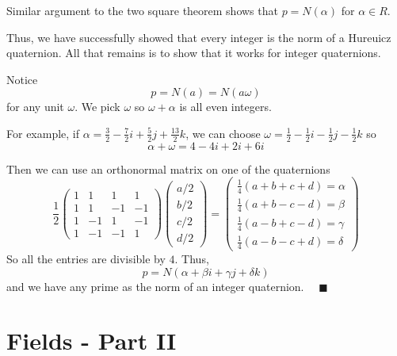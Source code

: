 \documentclass[12pt]{report}
\newcommand{\qed}{\quad \blacksquare}
\newenvironment*{tbox}[3][breakable]{
    \begin{tcolorbox}[
        parbox=false,
        colback=#2!5!white,
        colframe=#2!75!black,
        title={#3},
        #1
    ]}
    {\end{tcolorbox}}
\begin{document}
\begin{tbox}{gray}{\textbf{Theorem:} Every positive integer is the sum of four squares}
            Similar argument to the two square theorem shows that $p = N(\alpha)$ for $\alpha \in R$.

            Thus, we have successfully showed that every integer is the norm of a Hureuicz quaternion. All that remains is to show that it works for integer quaternions. 

            Notice 
            \[p = N(a) = N(a \omega)\]
            for any unit $\omega$. We pick $\omega$ so $\omega + \alpha$ is all even integers. 

            For example, if $\alpha = \frac{3}{2} - \frac{7}{2}i + \frac{5}{2}j + \frac{13}{2}k$, we can choose $\omega = \frac{1}{2} - \frac{1}{2}i - \frac{1}{2}j - \frac{1}{2}k$ so 
            \[\alpha + \omega = 4 - 4i + 2i + 6i\]
            
            Then we can use an orthonormal matrix on one of the quaternions
            \[\frac{1}{2}\begin{pmatrix}
                1 & 1 & 1 & 1\\
                1 & 1 & -1 & -1\\
                1 & -1 & 1 & -1\\
                1 & -1 & -1 & 1
            \end{pmatrix} \begin{pmatrix}
                a/2 \\ 
                b/2\\ 
                c/2\\ 
                d/2
            \end{pmatrix} = \begin{pmatrix}
                \frac{1}{4}(a + b + c + d) = \alpha\\ 
                \frac{1}{4}(a + b - c - d) = \beta\\
                \frac{1}{4}(a - b + c - d) = \gamma\\
                \frac{1}{4}(a - b - c + d) = \delta
            \end{pmatrix}\]
            So all the entries are divisible by $4$. Thus, 
            \[p = N(\alpha + \beta i + \gamma j + \delta k)\] 
            and we have any prime as the norm of an integer quaternion. $\qed$
        \end{tbox}

\chapter*{Fields - Part II}
\end{document}
